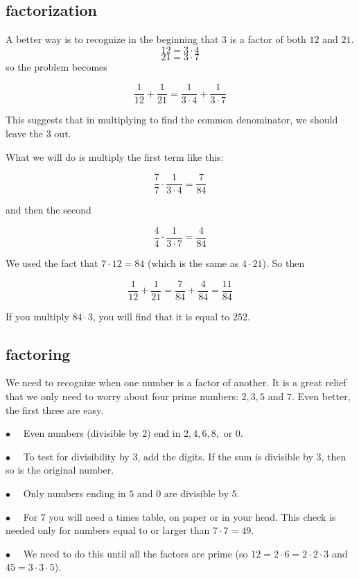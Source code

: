\documentclass[11pt, oneside]{article}
\begin{document}
\subsection*{factorization}

A better way is to recognize in the beginning that $3$ is a factor of both $12$ and $21$.
\[ 12 = 3 \cdot 4 \]
\[ 21 = 3 \cdot 7 \]
so the problem becomes

\[ \frac{1}{12} + \frac{1}{21} =  \frac{1}{3 \cdot 4} + \frac{1}{3 \cdot 7} \]

This suggests that in multiplying to find the common denominator, we should leave the $3$ out.

What we will do is multiply the first term like this:

\[  \frac{7}{7} \cdot \frac{1}{3 \cdot 4} = \frac{7}{84} \] 

and then the second

\[  \frac{4}{4} \cdot \frac{1}{3 \cdot 7} = \frac{4}{84}  \] 

We used the fact that $7 \cdot 12 = 84$ (which is the same as $4 \cdot 21$).  So then

\[ \frac{1}{12} + \frac{1}{21} =  \frac{7}{84} + \frac{4}{84} = \frac{11}{84} \]

If you multiply $84 \cdot 3$, you will find that it is equal to $252$.

\subsection*{factoring}

We need to recognize when one number is a factor of another.  It is a great relief that we only need to worry about four prime numbers:  $2,3,5$ and $7$.  Even better, the first three are easy.

$\bullet$ \ \  Even numbers (divisible by $2$) end in $2,4,6,8,$ or $0$.

$\bullet$ \ \  To test for divisibility by $3$, add the digits.  If the sum is divisible by $3$, then so is the original number.

$\bullet$ \ \  Only numbers ending in $5$ and $0$ are divisible by $5$.

$\bullet$ \ \  For $7$ you will need a times table, on paper or in your head.  This check is needed only for numbers equal to or larger than $7 \cdot 7 = 49$.

$\bullet$ \ \  We need to do this until all the factors are prime (so $12 = 2 \cdot 6 = 2 \cdot 2 \cdot 3$ and $45 = 3 \cdot 3 \cdot 5$).
\end{document}
